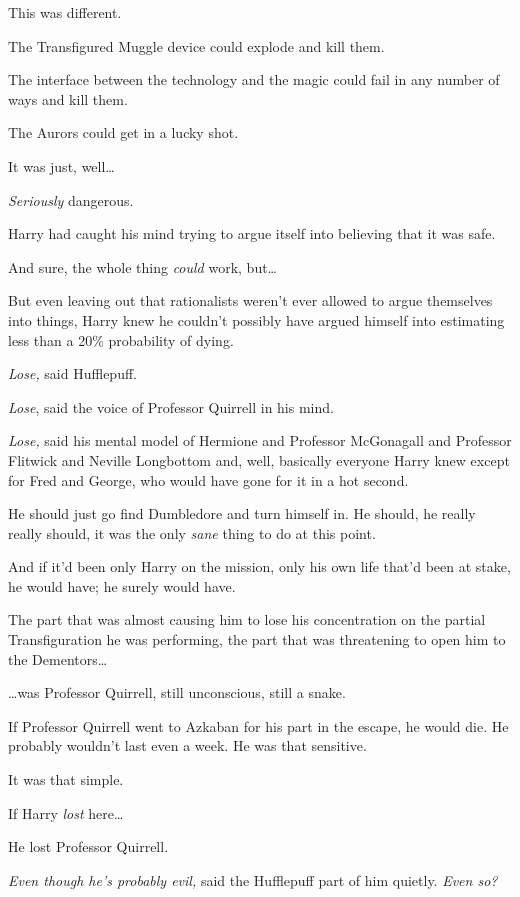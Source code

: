 This was different.

The Transfigured Muggle device could explode and kill them.

The interface between the technology and the magic could fail in any number of 
ways and kill them.

The Aurors could get in a lucky shot.

It was just, well{\ldots}

\emph{Seriously} dangerous.

Harry had caught his mind trying to argue itself into believing that it was 
safe.

And sure, the whole thing \emph{could} work, but{\ldots}

But even leaving out that rationalists weren't ever allowed to argue themselves 
into things, Harry knew he couldn't possibly have argued himself into 
estimating less than a 20\% probability of dying.

\emph{Lose,} said Hufflepuff.

\emph{Lose}, said the voice of Professor Quirrell in his mind.

\emph{Lose,} said his mental model of Hermione and Professor McGonagall and 
Professor Flitwick and Neville Longbottom and, well, basically everyone Harry 
knew except for Fred and George, who would have gone for it in a hot second.

He should just go find Dumbledore and turn himself in. He should, he really 
really should, it was the only \emph{sane} thing to do at this point.

And if it'd been only Harry on the mission, only his own life that'd been at 
stake, he would have; he surely would have.

The part that was almost causing him to lose his concentration on the partial 
Transfiguration he was performing, the part that was threatening to open him to 
the Dementors{\ldots}

{\ldots}was Professor Quirrell, still unconscious, still a snake.

If Professor Quirrell went to Azkaban for his part in the escape, he would die. 
He probably wouldn't last even a week. He was that sensitive.

It was that simple.

If Harry \emph{lost} here{\ldots}

He lost Professor Quirrell.

\emph{Even though he's probably evil,} said the Hufflepuff part of him quietly. 
\emph{Even so?}

